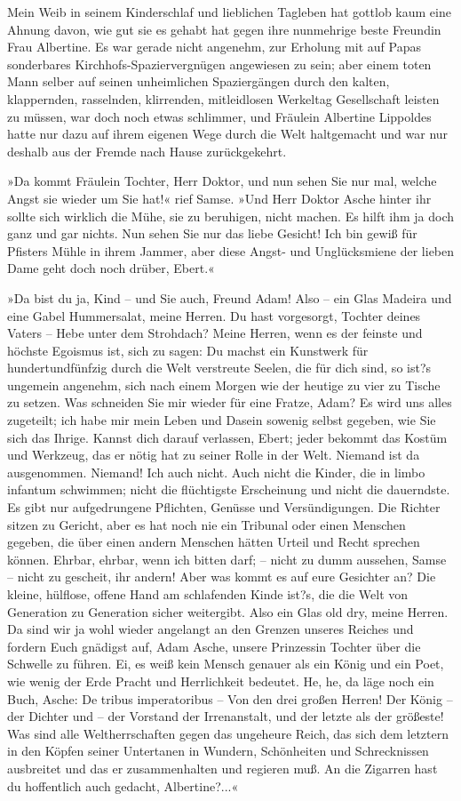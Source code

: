 Mein Weib in seinem Kinderschlaf und lieblichen Tagleben hat
gottlob kaum eine Ahnung davon, wie gut sie es gehabt hat gegen
ihre nunmehrige beste Freundin Frau Albertine. Es war gerade nicht
angenehm, zur Erholung mit auf Papas sonderbares
Kirchhofs-Spaziervergnügen angewiesen zu sein; aber einem toten
Mann selber auf seinen unheimlichen Spaziergängen durch den kalten,
klappernden, rasselnden, klirrenden, mitleidlosen Werkeltag
Gesellschaft leisten zu müssen, war doch noch etwas schlimmer, und
Fräulein Albertine Lippoldes hatte nur dazu auf ihrem eigenen Wege
durch die Welt haltgemacht und war nur deshalb aus der Fremde nach
Hause zurückgekehrt.

»Da kommt Fräulein Tochter, Herr Doktor, und nun sehen Sie nur mal,
welche Angst sie wieder um Sie hat!« rief Samse. »Und Herr Doktor
Asche hinter ihr sollte sich wirklich die Mühe, sie zu beruhigen,
nicht machen. Es hilft ihm ja doch ganz und gar nichts. Nun sehen
Sie nur das liebe Gesicht! Ich bin gewiß für Pfisters Mühle in
ihrem Jammer, aber diese Angst- und Unglücksmiene der lieben Dame
geht doch noch drüber, Ebert.«

»Da bist du ja, Kind – und Sie auch, Freund Adam! Also – ein Glas
Madeira und eine Gabel Hummersalat, meine Herren. Du hast
vorgesorgt, Tochter deines Vaters – Hebe unter dem Strohdach? Meine
Herren, wenn es der feinste und höchste Egoismus ist, sich zu
sagen: Du machst ein Kunstwerk für hundertundfünfzig durch die Welt
verstreute Seelen, die für dich sind, so ist?s ungemein angenehm,
sich nach einem Morgen wie der heutige zu vier zu Tische zu setzen.
Was schneiden Sie mir wieder für eine Fratze, Adam? Es wird uns
alles zugeteilt; ich habe mir mein Leben und Dasein sowenig selbst
gegeben, wie Sie sich das Ihrige. Kannst dich darauf verlassen,
Ebert; jeder bekommt das Kostüm und Werkzeug, das er nötig hat zu
seiner Rolle in der Welt. Niemand ist da ausgenommen. Niemand! Ich
auch nicht. Auch nicht die Kinder, die in limbo infantum schwimmen;
nicht die flüchtigste Erscheinung und nicht die dauerndste. Es gibt
nur aufgedrungene Pflichten, Genüsse und Versündigungen. Die
Richter sitzen zu Gericht, aber es hat noch nie ein Tribunal oder
einen Menschen gegeben, die über einen andern Menschen hätten
Urteil und Recht sprechen können. Ehrbar, ehrbar, wenn ich bitten
darf; – nicht zu dumm aussehen, Samse – nicht zu gescheit, ihr
andern! Aber was kommt es auf eure Gesichter an? Die kleine,
hülflose, offene Hand am schlafenden Kinde ist?s, die die Welt von
Generation zu Generation sicher weitergibt. Also ein Glas old dry,
meine Herren. Da sind wir ja wohl wieder angelangt an den Grenzen
unseres Reiches und fordern Euch gnädigst auf, Adam Asche, unsere
Prinzessin Tochter über die Schwelle zu führen. Ei, es weiß kein
Mensch genauer als ein König und ein Poet, wie wenig der Erde
Pracht und Herrlichkeit bedeutet. He, he, da läge noch ein Buch,
Asche: De tribus imperatoribus – Von den drei großen Herren! Der
König – der Dichter und – der Vorstand der Irrenanstalt, und der
letzte als der größeste! Was sind alle Weltherrschaften gegen das
ungeheure Reich, das sich dem letztern in den Köpfen seiner
Untertanen in Wundern, Schönheiten und Schrecknissen ausbreitet und
das er zusammenhalten und regieren muß. An die Zigarren hast du
hoffentlich auch gedacht, Albertine?...«

